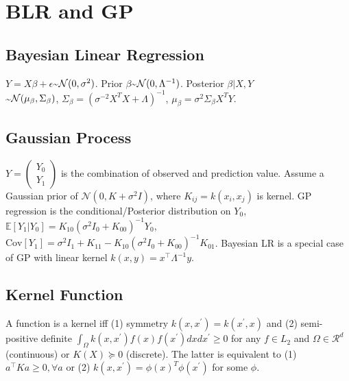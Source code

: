 \section{BLR and GP}

\subsection*{Bayesian Linear Regression}
\begin{scriptsize}$Y=X\beta+\epsilon$\textasciitilde$\mathcal{N}(0, \sigma^2)$. Prior $\beta $\textasciitilde$ \mathcal{N}(0, \Lambda^{-1})$. Posterior $\beta | X, Y $\\\textasciitilde$ \mathcal{N}(\mu_\beta, \Sigma_\beta)$, $\Sigma_\beta =  (\sigma^{-2}X^T X+\Lambda)^{-1}$, $\mu_\beta = \sigma^2\Sigma_{\beta}X^T Y$. \end{scriptsize}



\subsection*{Gaussian Process}
$Y = \left(\begin{matrix} Y_0 \\ Y_1 \end{matrix}\right)$ is the combination of observed and prediction value. Assume a Gaussian prior of $\mathcal{N}(0, K + \sigma^2 I)$, where $K_{ij}=k(x_i,x_j)$ is kernel. GP regression is the conditional/Posterior distribution on $Y_0$, $\mathbb{E} [Y_1|Y_0] = K_{1 0}(\sigma^{2} I_{0}+K_{00})^{-1}Y_0$, $\mathrm{Cov}[Y_1] = \sigma^{2}I_{1} + K_{11} - K_{10} (\sigma^2  I_{0} + K_{00})^{-1} K_{01}$. Bayesian LR is a special case of GP with linear kernel $k(x,y) = x^{\top}\Lambda^{-1}y$.

\subsection*{Kernel Function}
A function is a kernel iff (1) symmetry $k(x, x^\prime)=k(x^\prime, x)$ and (2) semi-positive definite $\int_\Omega k(x, x^\prime) f(x) f(x^\prime) dx dx^\prime \ge 0$ for any $f \in L_2$ and $\Omega \in \mathcal{R}^d$ (continuous) or $K(X)\succeq 0$ (discrete). The latter is equivalent to (1) $a^{\top} K a \geq 0, \forall a$ or (2) $k(x, x^\prime) = \phi(x)^T \phi(x^\prime)$ for some $\phi$.

